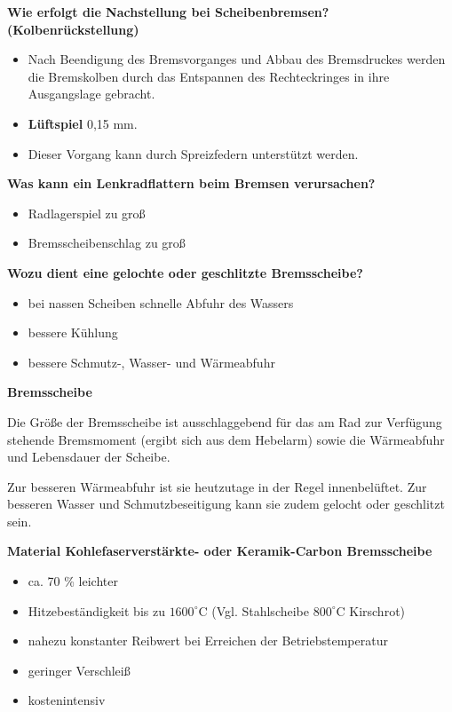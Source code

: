 \textbf{Wie erfolgt die Nachstellung bei Scheibenbremsen?
(Kolbenrückstellung)}

\begin{itemize}
\item
  Nach Beendigung des Bremsvorganges und Abbau des Bremsdruckes werden
  die Bremskolben durch das Entspannen des Rechteckringes in ihre
  Ausgangslage gebracht.
\item
  \textbf{Lüftspiel} 0,15 mm.
\item
  Dieser Vorgang kann durch Spreizfedern unterstützt werden.
\end{itemize}

\textbf{Was kann ein Lenkradflattern beim Bremsen verursachen?}

\begin{itemize}
\item
  Radlagerspiel zu groß
\item
  Bremsscheibenschlag zu groß
\end{itemize}

\textbf{Wozu dient eine gelochte oder geschlitzte Bremsscheibe?}

\begin{itemize}
\item
  bei nassen Scheiben schnelle Abfuhr des Wassers
\item
  bessere Kühlung
\item
  bessere Schmutz-, Wasser- und Wärmeabfuhr
\end{itemize}

\textbf{Bremsscheibe}

Die Größe der Bremsscheibe ist ausschlaggebend für das am Rad zur
Verfügung stehende Bremsmoment (ergibt sich aus dem Hebelarm) sowie die
Wärmeabfuhr und Lebensdauer der Scheibe.

Zur besseren Wärmeabfuhr ist sie heutzutage in der Regel innenbelüftet.
Zur besseren Wasser und Schmutzbeseitigung kann sie zudem gelocht oder
geschlitzt sein.

\textbf{Material Kohlefaserverstärkte- oder Keramik-Carbon Bremsscheibe}

\begin{itemize}
\item
  ca. 70 \% leichter
\item
  Hitzebeständigkeit bis zu $1600^\circ\text{C}$ (Vgl. Stahlscheibe
  $800^\circ\text{C}$ Kirschrot)
\item
  nahezu konstanter Reibwert bei Erreichen der Betriebstemperatur
\item
  geringer Verschleiß
\item
  kostenintensiv
\end{itemize}

